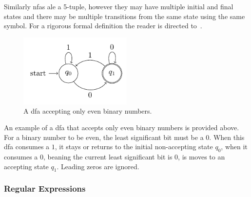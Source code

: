 Similarly \glspl{nfa} ale a 5-tuple, however they may have multiple initial and final states and there may be multiple transitions from the same state using the same symbol. For a rigorous formal definition the reader is directed to~\cite[Chapter~1.4]{Salomaa1987Formal}.

\begin{figure}[H]\label{fig:dfa}
  \centering
  \includegraphics[width=0.5\textwidth]{figures/dfa.pdf}
  \caption{A \gls{dfa} accepting only even binary numbers.}
\end{figure}

An example of a \gls{dfa} that accepts only even binary numbers is provided above. For a binary number to be even, the least significant bit must be a $0$. When this \gls{dfa} consumes a $1$, it stays or returns to the initial non-accepting state $q_0$, when it consumes a $0$, beaning the current least significant bit is $0$, is moves to an accepting state $q_1$. Leading zeros are ignored.





\subsubsection{Regular Expressions} 

